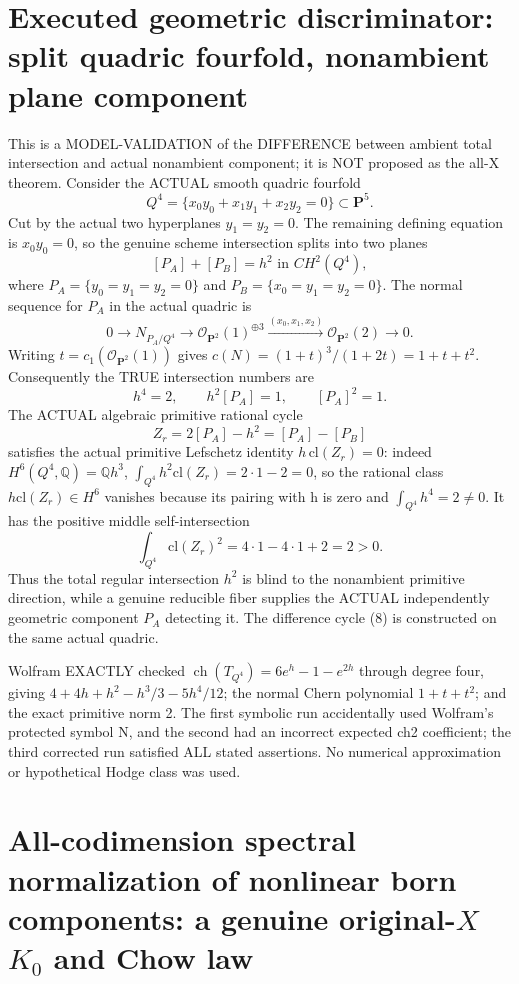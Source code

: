 \documentclass[11pt]{article}
\newcommand{\Q}{\mathbb Q}
\newcommand{\cl}{\mathrm{cl}}
\newcommand{\OO}{\mathcal O}
\begin{document}
\section{Executed geometric discriminator: split quadric fourfold, nonambient plane component}
This is a MODEL-VALIDATION of the DIFFERENCE between
ambient total intersection and actual nonambient
component; it is NOT proposed as the all-X theorem.
Consider the ACTUAL smooth quadric fourfold
\[
 Q^4=\{x_0y_0+x_1y_1+x_2y_2=0\}\subset\mathbf P^5.
\]
Cut by the actual two hyperplanes \(y_1=y_2=0\).
The remaining defining equation is \(x_0y_0=0\),
so the genuine scheme intersection splits into two planes
\[
 \boxed{[P_A]+[P_B]=h^2\text{ in }CH^2(Q^4),}     \tag{7}
\]
where \(P_A=\{y_0=y_1=y_2=0\}\) and
\(P_B=\{x_0=y_1=y_2=0\}\).
The normal sequence for \(P_A\) in the actual quadric is
\[
 0\longrightarrow N_{P_A/Q^4}
 \longrightarrow \OO_{\mathbf P^2}(1)^{\oplus3}
 \xrightarrow{(x_0,x_1,x_2)}
          \OO_{\mathbf P^2}(2)\longrightarrow0.
\]
Writing \(t=c_1(\OO_{\mathbf P^2}(1))\) gives
\(c(N)=(1+t)^3/(1+2t)=1+t+t^2\).
Consequently the TRUE intersection numbers are
\[
 h^4=2,\qquad h^2[P_A]=1,\qquad[P_A]^2=1.
\]
The ACTUAL algebraic primitive rational cycle
\[
 \boxed{Z_r=2[P_A]-h^2=[P_A]-[P_B]}               \tag{8}
\]
satisfies the actual primitive Lefschetz identity
\(h\,\cl(Z_r)=0\): indeed \(H^6(Q^4,\Q)=\Q h^3\),
\(\int_{Q^4} h^2\cl(Z_r)=2\cdot1-2=0\),
so the rational class \(h\cl(Z_r)\in H^6\)
vanishes because its pairing with h is zero
and \(\int_{Q^4}h^4=2\ne0\). It has the positive middle
self-intersection
\[
 \boxed{\int_{Q^4}\cl(Z_r)^2
        =4\cdot1-4\cdot1+2=2>0.}                 \tag{9}
\]
Thus the total regular intersection \(h^2\)
is blind to the nonambient primitive direction,
while a genuine reducible fiber supplies the
ACTUAL independently geometric component
\(P_A\) detecting it. The difference cycle (8)
is constructed on the same actual quadric.

Wolfram EXACTLY checked
\(\operatorname{ch}(T_{Q^4})=6e^h-1-e^{2h}\)
through degree four, giving
\(4+4h+h^2-h^3/3-5h^4/12\);
the normal Chern polynomial \(1+t+t^2\);
and the exact primitive norm 2.
The first symbolic run accidentally used Wolfram's
protected symbol N, and the second had an incorrect
expected ch2 coefficient; the third corrected run
satisfied ALL stated assertions. No numerical
approximation or hypothetical Hodge class was used.


\section{All-codimension spectral normalization of nonlinear born components:
a genuine original-$X$ $K_0$ and Chow law}
\end{document}
